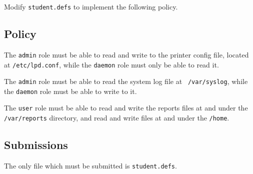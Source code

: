 \documentclass[11pt,oneside,letterpaper]{article}
\begin{document}
Modify {\tt student.defs} to implement the following policy.

\subsection{Policy}

The {\tt admin} role must be able to read and write to the printer config file,
located at {\tt /etc/lpd.conf}, while the {\tt daemon} role must only be able
to read it.

The {\tt admin} role must be able to read the system log file at {\tt
/var/syslog}, while the {\tt daemon} role must be able to write to it.

The {\tt user} role must be able to read and write the reports files
at and under the {\tt /var/reports} directory, and read and write files at and under the {\tt /home}.

\subsection{Submissions}

The only file which must be submitted is {\tt student.defs}.
\end{document}
